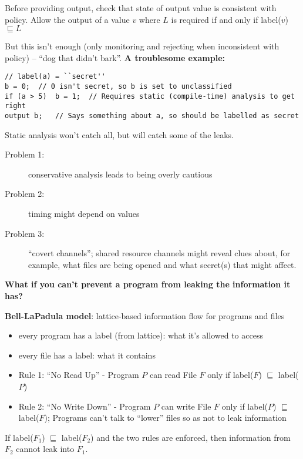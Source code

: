 Before providing output, check that state of output value is consistent with
policy. Allow the output of a value $v$ where $L$ is required if and only if label($v$) $\sqsubseteq L$

But this isn't enough (only monitoring and rejecting when inconsistent with
policy) -- ``dog that didn't bark''. \textbf{A troublesome example:}
\begin{verbatim}
// label(a) = ``secret''
b = 0;  // 0 isn't secret, so b is set to unclassified
if (a > 5)  b = 1;  // Requires static (compile-time) analysis to get right
output b;   // Says something about a, so should be labelled as secret
\end{verbatim}
Static analysis won't catch all, but will catch some of the leaks.
\begin{description}
    \item[Problem 1:] conservative analysis leads to being overly cautious
    \item[Problem 2:] timing might depend on values
    \item[Problem 3:] ``covert channels''; shared resource channels might reveal clues about, for example, what files are being opened and what secret(s) that might affect.
\end{description}

{\bf What if you can't prevent a program from leaking the information it has?}

{\bf Bell-LaPadula model}: lattice-based information flow for programs and files
\begin{itemize}
\item every program has a label (from lattice): what it's allowed to access
\item every file has a label: what it contains
\item Rule 1: ``No Read Up'' - Program $P$ can read File $F$ only if label($F$)
    $\sqsubseteq$ label($P$)
\item Rule 2: ``No Write Down'' - Program $P$ can write File $F$ only if
    label($P$) $\sqsubseteq$ label($F$); Programs can't talk to ``lower'' files so as
    not to leak information
\end{itemize}
\begin{theorem*} If label($F_1$) $\sqsubseteq$ label($F_2$) and the two rules are
enforced, then information from $F_2$ cannot leak into $F_1$.
\end{theorem*}

